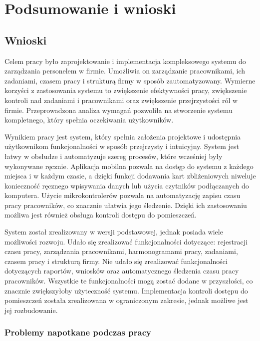 \chapter{Podsumowanie i wnioski}

\section{Wnioski}

Celem pracy było zaprojektowanie i implementacja kompleksowego systemu do zarządzania personelem w firmie. Umożliwia on zarządzanie pracownikami, ich zadaniami, czasem pracy i strukturą firmy w sposób zautomatyzowany. Wymierne korzyści z zastosowania systemu to zwiększenie efektywności pracy, zwiększenie kontroli nad zadaniami i pracownikami oraz zwiększenie przejrzystości ról w firmie. Przeprowadzona analiza wymagań pozwoliła na stworzenie systemu kompletnego, który spełnia oczekiwania użytkowników.

Wynikiem pracy jest system, który spełnia założenia projektowe i udostępnia użytkownikom funkcjonalności w sposób przejrzysty i intuicyjny. System jest łatwy w obsłudze i automatyzuje szereg procesów, które wcześniej były wykonywane ręcznie. Aplikacja mobilna pozwala na dostęp do systemu z każdego miejsca i w każdym czasie, a dzięki funkcji dodawania kart zbliżeniowych niweluje konieczność ręcznego wpisywania danych lub użycia czytników podłączanych do komputera. Użycie mikrokontrolerów pozwala na automatyzację zapisu czasu pracy pracowników, co znacznie ułatwia jego śledzenie. Dzięki ich zastosowaniu możliwa jest również obsługa kontroli dostępu do pomieszczeń.

System został zrealizowany w wersji podstawowej, jednak posiada wiele możliwości rozwoju. Udało się zrealizować funkcjonalności dotyczące: rejestracji czasu pracy, zarządzania pracownikami, harmonogramami pracy, zadaniami, czasem pracy i strukturą firmy. Nie udało się zrealizować funkcjonalności dotyczących raportów, wniosków oraz automatycznego śledzenia czasu pracy pracowników. Wszystkie te funkcjonalności mogą zostać dodane w przyszłości, co znacznie zwiększyłoby użyteczność systemu. Implementacja kontroli dostępu do pomieszczeń została zrealizowana w ograniczonym zakresie, jednak możliwe jest jej rozbudowanie.

\subsection{Problemy napotkane podczas pracy}

